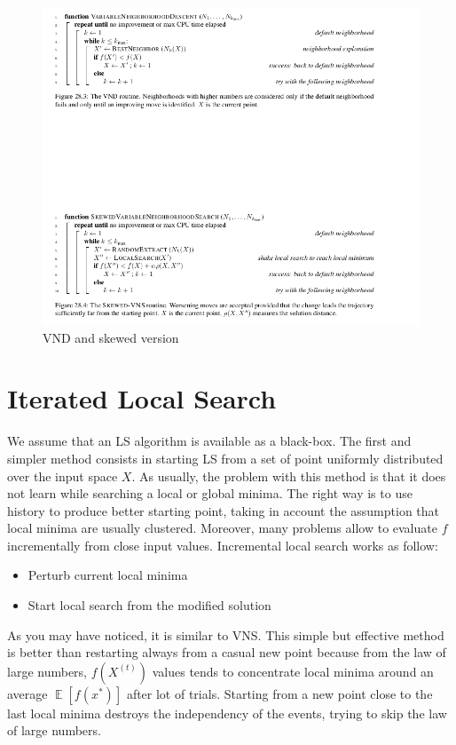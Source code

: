 \documentclass[10pt]{article}
\DeclareMathOperator{\E}{\mathbb{E}}
\begin{document}
\begin{figure}[H]
\includegraphics[scale=0.50]{vns}
\caption{VND and skewed version}
\centering
\end{figure}

\section{Iterated Local Search}
We assume that an LS algorithm is available as a black-box. The first and simpler method consists in starting LS from a set of point uniformly distributed over the input space $X$. As usually, the problem with this method is that it does not learn while searching a local or global minima. The right way is to use history to produce better starting point, taking in account the assumption that local minima are usually clustered. Moreover, many problems allow to evaluate $f$ incrementally from close input values.
Incremental local search works as follow:
\begin{itemize}
\item{Perturb current local minima}
\item{Start local search from the modified solution}
\end{itemize}
As you may have noticed, it is similar to VNS. This simple but effective method is better than restarting always from a casual new point because from the law of large numbers, $f(X^{(t)})$ values tends to concentrate local minima around an average $\E[f(x^*)]$ after lot of trials. Starting from a new point close to the last local minima destroys the independency of the events, trying to skip the law of large numbers.
\end{document}
